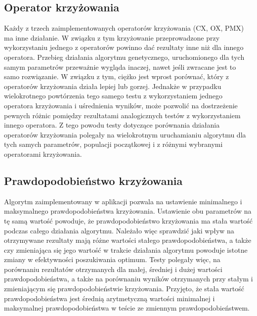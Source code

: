 \subsection{Operator krzyżowania}
Każdy z trzech zaimplementowanych operatorów krzyżowania (CX, OX, PMX) ma inne działanie. W związku z tym krzyżowanie przeprowadzone przy wykorzystaniu jednego z operatorów powinno dać rezultaty inne niż dla innego operatora. Przebieg działania algorytmu genetycznego, uruchomionego dla tych samym parametrów przeważnie wygląda inaczej, nawet jeśli zwracane jest to samo rozwiązanie. W związku z tym, ciężko jest wprost porównać, który z operatorów krzyżowania działa lepiej lub gorzej. Jednakże w przypadku wielokrotnego powtórzenia tego samego testu z wykorzystaniem jednego operatora krzyżowania i uśrednienia wyników, może pozwolić na dostrzeżenie pewnych różnic pomiędzy rezultatami analogicznych testów z wykorzystaniem innego operatora. Z tego powodu testy dotyczące porównania działania operatorów krzyżowania polegały na wielokrotnym uruchamianiu algorytmu dla tych samych parametrów, populacji początkowej i z różnymi wybranymi operatorami krzyżowania.

\subsection{Prawdopodobieństwo krzyżowania}
Algorytm zaimplementowany w aplikacji pozwala na ustawienie minimalnego i maksymalnego prawdopodobieństwa krzyżowania. Ustawienie obu parametrów na tę samą wartość powoduje, że prawdopodobieństwo krzyżowania ma stała wartość podczas całego działania algorytmu. Należało więc sprawdzić jaki wpływ na otrzymywane rezultaty mają różne wartości stałego prawdopodobieństwa, a także czy zmieniająca się jego wartość w trakcie działania algorytmu powoduje istotne zmiany w efektywności poszukiwania optimum. Testy polegały więc, na porównaniu rezultatów otrzymanych dla małej, średniej i dużej wartości prawdopodobieństwa, a także na porównaniu wyników otrzymanych przy stałym i zmieniającym się prawdopodobieństwie krzyżowania. Przyjęto, że stała wartość prawdopodobieństwa jest średnią arytmetyczną wartości minimalnej i maksymalnej prawdopodobieństwa w teście ze zmiennym prawdopodobieństwem.

